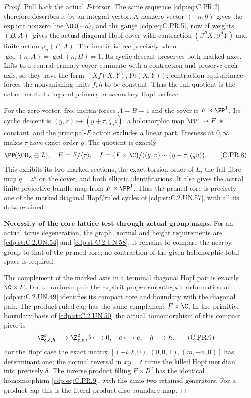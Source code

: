 \begin{proof}
Pull back the actual $F$-torsor. The same sequence \eqref{cdp:eq:C.PR.2}
therefore describes it by an integral vector. A nonzero vector
$(-n,0)$ gives the explicit nonzero line $\OO(-n)$, and the
gauge \eqref{cdp:eq:C.PR.5}, now of weights $(B,A)$, gives the actual diagonal
Hopf cover with contraction $(\beta^BX,\beta^AY)$ and finite
action $\mu_n(B,A)$. The inertia is free precisely when
$\gcd(n,A)=\gcd(n,B)=1$. Its cyclic descent preserves both
marked axes. Lifts to a central primary cover commute with a
contraction and preserve each axis, so they have the form
$(Xf(X,Y),Yh(X,Y))$; contraction equivariance forces the
nonvanishing units $f,h$ to be constant. Thus the full quotient
is the actual marked diagonal primary or secondary Hopf surface.

For the zero vector, free inertia forces $A=B=1$ and the cover
is $F\times\PP^1$. Its cyclic descent is
$(y,z)\mapsto(y+\tau,\zeta_g z)$: a holomorphic map
$\PP^1\to F$ is constant, and the principal-$F$ action excludes
a linear part. Freeness at $0,\infty$ makes $\tau$ have exact
order $g$. The quotient is exactly
\[
        \PP(\OO_E\oplus L),\quad
        E=F/\langle\tau\rangle,\quad
        L=(F\times\C)/((y,v)\sim(y+\tau,\zeta_gv)).
                                                        \tag{C.PR.8}\label{cdp:eq:C.PR.8}
\]
This exhibits its two marked sections, the exact torsion order
of $L$, the full fibre map $q=z^g$ on the cover, and both
elliptic identifications. It also gives the actual finite
projective-bundle map from $F\times\PP^1$.
Thus the pruned core is precisely one of the marked diagonal
Hopf/ruled cycles of \ref{cdp:st:C.2.UN.57}, with all its data retained.

\par\medskip\noindent\textbf{Necessity of the core lattice test through actual group maps.}
For an actual torus degeneration, the graph, normal and height
requirements are \ref{cdp:st:C.2.UN.54} and \ref{cdp:st:C.2.UN.58}. It remains to compare
the nearby group to that of the pruned core; no contraction of
the given holomorphic total space is required.

The complement of the marked axis in a terminal diagonal Hopf
pair is exactly $\C\times F$. For a nonlinear pair the explicit
proper smooth-pair deformation of \ref{cdp:st:C.2.UN.49} identifies its compact
core and boundary with the diagonal pair. The product ruled cap
has the same complement $F\times\C$. In the primitive boundary
basis of \ref{cdp:st:C.2.UN.50} the actual homomorphism of this compact
piece is
\[
        \Z^3_{\delta,e,h}\longrightarrow\Z^2_{e,h},
                  \delta\longmapsto0,\quad
                  e\longmapsto e,\quad h\longmapsto h. \tag{C.PR.9}\label{cdp:eq:C.PR.9}
\]
For the Hopf case the exact matrix
$[(-l,k,0),(0,0,1),(m,-n,0)]$ has determinant one;
the normal reversal in $xy=t$ turns the killed Hopf meridian
into precisely $\delta$. The inverse product filling
$F\times D^2$ has the identical homomorphism \eqref{cdp:eq:C.PR.9},
with the same two retained generators. For a product cap this
is the literal product-disc boundary map.


\end{proof}
